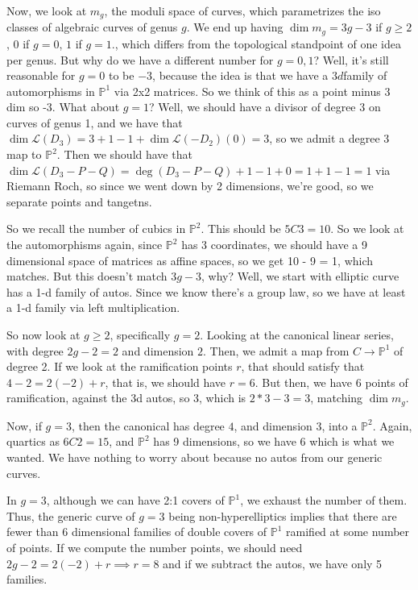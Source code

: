 \documentclass[10pt]{article}
\begin{document}
Now, we look at $m_g$, the moduli space of curves, which parametrizes the iso classes of algebraic curves of genus $g$. We end up having $\dim m_g = 3g -3$ if $g \geq 2$, $0$ if $g = 0$, $1$ if $g = 1$., which differs from the topological standpoint of one idea per genus. But why do we have a different number for $g = 0, 1$? Well, it’s still reasonable for $g = 0$ to be $-3$, because the idea is that we have a $3d$family of automorphisms in $\mathbb{P}^1$ via 2x2 matrices. So we think of this as a point minus 3 dim so -3. What about $g= 1$? Well, we should have a divisor of degree $3$ on curves of genus 1, and we have that $\dim \mathcal{L}(D_3) = 3 + 1 - 1 + \dim \mathcal{L}(-D_2) (0) = 3$, so we admit a degree 3 map to $\mathbb{P}^2$. Then we should have that $\dim \mathcal{L}(D_3 - P - Q) = \deg (D_3 - P - Q) + 1 - 1 + 0 = 1 + 1 - 1 = 1$ via Riemann Roch, so since we went down by 2 dimensions, we’re good, so we separate points and tangetns.

So we recall the number of cubics in $\mathbb{P}^2$. This should be $5C3 = 10$. So we look at the automorphisms again, since $\mathbb{P}^2$ has 3 coordinates, we should have a 9 dimensional space of matrices as affine spaces, so we get 10 - 9 = 1, which matches. But this doesn’t match $3g - 3$, why? Well, we start with elliptic curve has a 1-d family of autos. Since we know there’s a group law, so we have at least a 1-d family via left multiplication.

So now look at $g \geq 2$, specifically $g = 2$. Looking at the canonical linear series, with degree $2g - 2 = 2$ and dimension $2$. Then, we admit a map from $C \to \mathbb{P}^1$ of degree 2. If we look at the ramification points $r$, that should satisfy that $4 - 2 = 2( -2) + r$, that is, we should have $r = 6$. But then, we have 6 points of ramification, against the 3d autos, so 3, which is $2 * 3 - 3 = 3$, matching $\dim m_g$.

Now, if $g = 3$, then the canonical has degree $4$, and dimension $3$, into a $\mathbb{P}^2$. Again, quartics as $6C2 = 15$, and $\mathbb{P}^2$ has 9 dimensions, so we have 6 which is what we wanted. We have nothing to worry about because no autos from our generic curves. 

In $g=3$, although we can have 2:1 covers of $\mathbb{P}^1$, we exhaust the number of them. Thus, the generic curve of $g = 3$ being non-hyperelliptics implies that there are fewer than $6$ dimensional families of double covers of $\mathbb{P}^1$ ramified at some number of points. If we compute the number points, we should need $2g - 2 = 2(-2) + r \implies r = 8$ and if we subtract the autos, we have only 5 families. 
\end{document}
